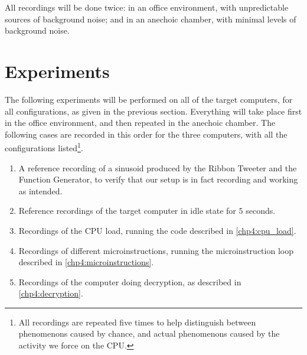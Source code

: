 All recordings will be done twice: in an office environment, with unpredictable sources of background noise; and in an anechoic chamber, with minimal levels of background noise.

\section{Experiments}

The following experiments will be performed on all of the target computers, for all configurations, as given in the previous section.
Everything will take place first in the office environment, and then repeated in the anechoic chamber. The following cases are recorded in this order for the three computers, with all the configurations listed\footnote{All recordings are repeated five times to help distinguish between phenomenons caused by chance, and actual phenomenons caused by the activity we force on the CPU.}.

\begin{enumerate}
	\item A reference recording of a sinusoid produced by the Ribbon Tweeter and the Function Generator, to verify that our setup is in fact recording and working as intended.
	\item Reference recordings of the target computer in idle state for $5$ seconds.
	\item Recordings of the CPU load, running the code described in \autoref{chp4:cpu_load}.
	\item Recordings of different microinstructions, running the microinstruction loop described in \autoref{chp4:microinstructions}.
	\item Recordings of the computer doing decryption, as described in \autoref{chp4:decryption}. 
\end{enumerate}